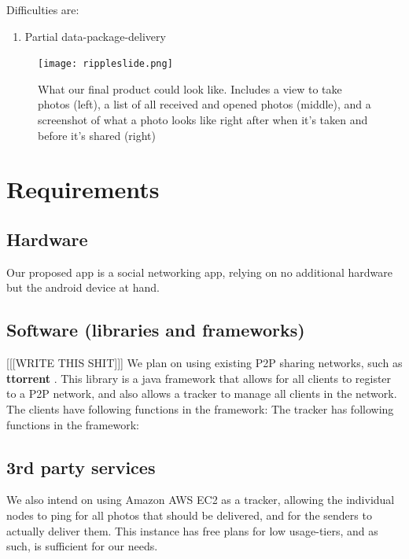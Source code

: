 \documentclass{report}
\newcommand{\lfig}[1]{\label{fig:#1}}
\begin{document}
Difficulties are:
\begin{enumerate}
\item Partial data-package-delivery
\end{enumerate}

\begin{figure}[h]
	\centering
    \texttt{[image: rippleslide.png]}
    \lfig{example}
    \vspace{-5mm} %
	\caption{What our final product could look like. Includes a view to take photos (left), a list of all received and opened photos (middle), and a screenshot of what a photo looks like right after when it's taken and before it's shared (right)}
\end{figure}



\section{Requirements}

\subsection{Hardware}
Our proposed app is a social networking app, relying on no additional hardware but the android device at hand.

\subsection{Software (libraries and frameworks)}
[[[WRITE THIS SHIT]]]
We plan on using existing P2P sharing networks, such as \textbf{ttorrent} \cite{ttorrentLink}.
This library is a java framework that allows for all clients to register to a P2P network, and also allows a tracker to manage all clients in the network.
The clients have following functions in the framework:
The tracker has following functions in the framework:

\subsection{3rd party services}
We also intend on using Amazon AWS EC2  as a tracker, allowing the individual nodes to ping for all photos that should be delivered, and for the senders to actually deliver them.
This instance has free plans for low usage-tiers, and as such, is sufficient for our needs.
\end{document}
